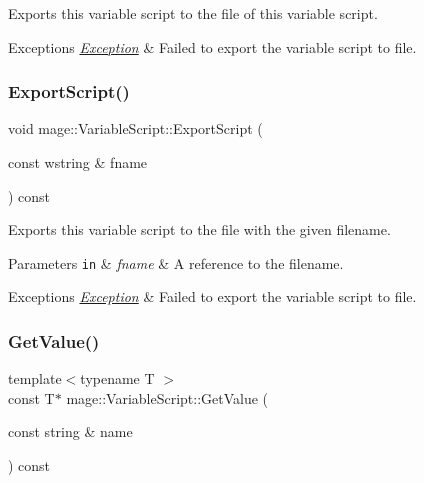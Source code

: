 Exports this variable script to the file of this variable script.


\begin{DoxyExceptions}{Exceptions}
{\em \hyperlink{classmage_1_1_exception}{Exception}} & Failed to export the variable script to file. \\
\hline
\end{DoxyExceptions}
\hypertarget{classmage_1_1_variable_script_a05ce2bcc72418422a443bcd8eff23486}{}\label{classmage_1_1_variable_script_a05ce2bcc72418422a443bcd8eff23486} 
\subsubsection{\texorpdfstring{Export\+Script()}{ExportScript()}\hspace{0.1cm}{\footnotesize\ttfamily [2/2]}}
{\footnotesize\ttfamily void mage\+::\+Variable\+Script\+::\+Export\+Script (\begin{DoxyParamCaption}\item[{const wstring \&}]{fname }\end{DoxyParamCaption}) const}

Exports this variable script to the file with the given filename.


\begin{DoxyParams}[1]{Parameters}
\mbox{\tt in}  & {\em fname} & A reference to the filename. \\
\hline
\end{DoxyParams}

\begin{DoxyExceptions}{Exceptions}
{\em \hyperlink{classmage_1_1_exception}{Exception}} & Failed to export the variable script to file. \\
\hline
\end{DoxyExceptions}
\hypertarget{classmage_1_1_variable_script_aaed50c03f7affeeac269fbc15248caf6}{}\label{classmage_1_1_variable_script_aaed50c03f7affeeac269fbc15248caf6} 
\subsubsection{\texorpdfstring{Get\+Value()}{GetValue()}}
{\footnotesize\ttfamily template$<$typename T $>$ \\
const T$\ast$ mage\+::\+Variable\+Script\+::\+Get\+Value (\begin{DoxyParamCaption}\item[{const string \&}]{name }\end{DoxyParamCaption}) const}

